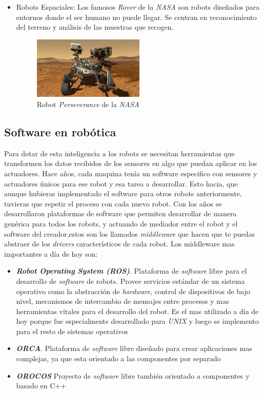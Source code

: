 \begin{itemize}
    \item Robots Espaciales: Los famosos \textit{Rover} de la \textit{NASA} son robots diseñados para entornos donde el ser humano no puede llegar. Se centran en reconocimiento del terreno y análisis de las muestras que recogen.
        \begin{figure}[H]
    \centering
    \includegraphics[width=0.5\textwidth]{img/perseverance.jpg}
    \caption{Robot \textit{Perseverance} de la \textit{NASA}} \label{fig:Perseverance}
    \end{figure}
\end{itemize}

\subsection{Software en robótica}
\label{subsec:softwarerobot}
Para dotar de esta inteligencia a los robots se necesitan herramientas que transformen los datos recibidos de los sensores en algo que puedan aplicar en los actuadores. Hace años, cada maquina tenía un software especifico con sensores y actuadores únicos para ese robot y esa tarea a desarrollar. Esto hacia, que aunque hubieras implementado el software para otros robots anteriormente, tuvieras que repetir el proceso con cada nuevo robot. Con los años se desarrollaron plataformas de software que permiten desarrollar de manera genérica para todos los robots, y actuando de mediador entre el robot y el software del creador,estos son los llamados \textit{middleware} que hacen que te puedas abstraer de los \textit{drivers} característicos de cada robot. Los middleware mas importantes a día de hoy son:
\begin{itemize}
    \item \textit{\textbf{Robot Operating System (ROS)}}\cite{bib:ros}. Plataforma de \textit{software} libre para el desarrollo de \textit{software} de robots. Provee servicios estándar de un sistema operativo como la abstracción de \textit{hardware}, control de dispositivos de bajo nivel, mecanismos de intercambio de mensajes entre procesos y mas herramientas vitales para el desarrollo del robot. Es el mas utilizado a día de hoy porque fue especialmente desarrollado para \textit{UNIX} y luego se implemento para el resto de sistemas operativos
    \item \textit{\textbf{ORCA}}\cite{bib:orca}. Plataforma de \textit{software} libre diseñado para crear aplicaciones mas complejas, ya que esta orientado a las componentes por separado
     \item \textit{\textbf{OROCOS}}\cite{bib:orocos} Proyecto de \textit{software} libre también orientado a componentes y basado en C++

\end{itemize}{}

